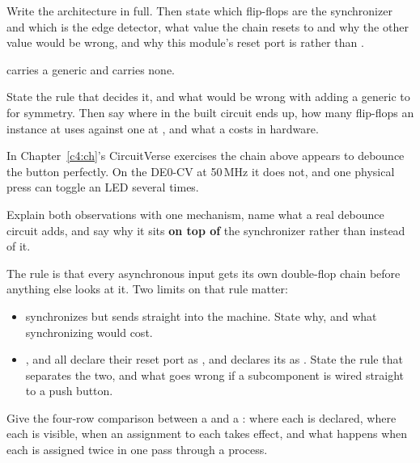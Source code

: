 \noindent Write the architecture in full. Then state which flip-flops are the synchronizer and
which is the edge detector, what value the chain resets to and why the other value would be wrong,
and why this module's reset port is  rather than . 

  carries a generic and  carries none.

State the rule that decides it, and what would be wrong with adding a  generic to
 for symmetry. Then say where in the built circuit  ends up, how many
flip-flops an instance at  uses against one at , and what a
 costs in hardware. 

 In Chapter~\ref{c4:ch}'s CircuitVerse exercises the chain above appears to debounce the
button perfectly. On the DE0-CV at 50\,MHz it does not, and one physical press can toggle an LED
several times.

Explain both observations with one mechanism, name what a real debounce circuit adds, and say why
it sits \textbf{on top of} the synchronizer rather than instead of it. 

 The rule is that every asynchronous input gets its own double-flop chain before anything
else looks at it. Two limits on that rule matter:
\begin{itemize}
  \item {} synchronizes  but sends  straight into the
    machine. State why, and what synchronizing  would cost.
  \item {},  and  all declare their reset port as
    , and  declares its as . State the rule that
    separates the two, and what goes wrong if a subcomponent is wired straight to a push button.
\end{itemize}

\label{exb:q:5}

 Give the four-row comparison between a  and a : where each is
declared, where each is visible, when an assignment to each takes effect, and what happens when
each is assigned twice in one pass through a process.

